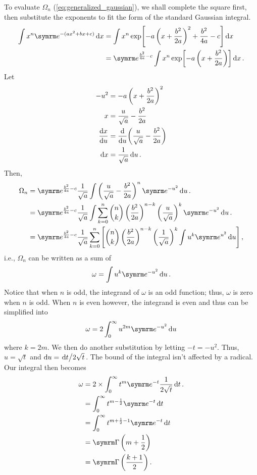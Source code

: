 To evaluate $\Omega_n$ (\cref{eq:generalized_gaussian}), we shall complete the square first, then substitute the exponents to fit the form of the standard Gaussian integral.
\begin{align*}
    \int x^n\e^{-(ax^2 + bx + c)}\dd{x} &= \int x^n\exp[-a\left(x + \frac{b^2}{2a}\right)^2 + \frac{b^2}{4a} - c]\dd{x} \\
    &= \e^{\frac{b^2}{4a} - c}\int x^n\exp[-a\left(x + \frac{b^2}{2a}\right)]\dd{x}.
\end{align*}
Let
\begin{align}
    -u^2 &= -a\left(x + \frac{b^2}{2a}\right)^2 \\
    x &= \frac{u}{\sqrt{a}} - \frac{b^2}{2a} \\
    \dv{x}{u} &= \dv{u}(\frac{u}{\sqrt{a}} - \frac{b^2}{2a}) \\
    \dd{x} &= \frac{1}{\sqrt{a}}\dd{u}.
\end{align}
Then,
\begin{align}
    \Omega_n &= \e^{\frac{b^2}{4a} - c}\frac{1}{\sqrt{a}}\int\left(\frac{u}{\sqrt{a}} - \frac{b^2}{2a}\right)^n\e^{-u^2}\dd{u}. \\
    &= \e^{\frac{b^2}{4a} - c}\frac{1}{\sqrt{a}}\int\sum_{k = 0}^{n}{n \choose k}\left(\frac{b^2}{2a}\right)^{n - k}\left(\frac{u}{\sqrt{a}}\right)^k\e^{-u^2}\dd{u}. \\
    &= \e^{\frac{b^2}{4a} - c}\frac{1}{\sqrt{a}}\sum_{k = 0}^{n}\left[{n \choose k}\left(\frac{b^2}{2a}\right)^{n - k}\left(\frac{1}{\sqrt{a}}\right)^{k} \int u^k\e^{u^2}\dd{u}\right], \label{eq:generalized_gaussian-1}
\end{align}
i.e., $\Omega_n$ can be written as a sum of
\begin{equation}
    \omega = \int u^k\e^{-u^2}\dd{u}.
\end{equation}
Notice that when $n$ is odd, the integrand of $\omega$ is an odd function; thus, $\omega$ is zero when $n$ is odd. When $n$ is even however, the integrand is even and thus can be simplified into
\begin{equation}
    \omega = 2\int_{0}^{\infty} u^{2m}\e^{-u^2}\dd{u}
\end{equation}
where $k = 2m$. We then do another substitution by letting $-t = -u^2$. Thus, $u = \sqrt{t}$ and $\dd{u} = \flatfrac{\dd{t}}{2\sqrt{t}}$. The bound of the integral isn't affected by a radical. Our integral then becomes
\begin{align}
    \omega &= 2 \times \int_{0}^{\infty}t^{m}\e^{-t}\frac{1}{2\sqrt{t}}\dd{t}. \\
    &= \int_{0}^{\infty}t^{m - \frac{1}{2}}\e^{-t}\dd{t} \\
    &= \int_{0}^{\infty}t^{m + \frac{1}{2} - 1}\e^{-t}\dd{t} \\
    &= \fgamma\left(m + \frac{1}{2}\right) \\
    &= \fgamma\left(\frac{k + 1}{2}\right).
\end{align}
